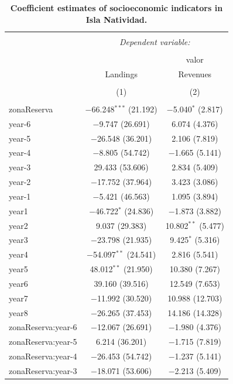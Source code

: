 \documentclass[10pt]{article}
\begin{document}
\clearpage

\begin{table}[h] \centering 
  \caption{{\bf Coefficient estimates of socioeconomic indicators in Isla Natividad.}} 
  \label{} 
\small 
\begin{tabular}{@{\extracolsep{1pt}}lcc} 
\\[-1.8ex]\hline 
\hline \\[-1.8ex] 
 & \multicolumn{2}{c}{\textit{Dependent variable:}} \\ 
\cline{2-3} 
\\[-1.8ex] &  & valor \\ 
 & Landings & Revenues \\ 
\\[-1.8ex] & (1) & (2)\\ 
\hline \\[-1.8ex] 
 zonaReserva & $-$66.248$^{***}$ (21.192) & $-$5.040$^{*}$ (2.817) \\ 
  year-6 & $-$9.747 (26.691) & 6.074 (4.376) \\ 
  year-5 & $-$26.548 (36.201) & 2.106 (7.819) \\ 
  year-4 & $-$8.805 (54.742) & $-$1.665 (5.141) \\ 
  year-3 & 29.433 (53.606) & 2.834 (5.409) \\ 
  year-2 & $-$17.752 (37.964) & 3.423 (3.086) \\ 
  year-1 & $-$5.421 (46.563) & 1.095 (3.894) \\ 
  year1 & $-$46.722$^{*}$ (24.836) & $-$1.873 (3.882) \\ 
  year2 & 9.037 (29.383) & 10.802$^{**}$ (5.477) \\ 
  year3 & $-$23.798 (21.935) & 9.425$^{*}$ (5.316) \\ 
  year4 & $-$54.097$^{**}$ (24.541) & 2.816 (5.541) \\ 
  year5 & 48.012$^{**}$ (21.950) & 10.380 (7.267) \\ 
  year6 & 39.160 (39.516) & 12.549 (7.653) \\ 
  year7 & $-$11.992 (30.520) & 10.988 (12.703) \\ 
  year8 & $-$26.265 (37.453) & 14.186 (14.328) \\ 
  zonaReserva:year-6 & $-$12.067 (26.691) & $-$1.980 (4.376) \\ 
  zonaReserva:year-5 & 6.214 (36.201) & $-$1.715 (7.819) \\ 
  zonaReserva:year-4 & $-$26.453 (54.742) & $-$1.237 (5.141) \\ 
  zonaReserva:year-3 & $-$18.071 (53.606) & $-$2.213 (5.409) \\ 

\end{tabular}
\end{table}
\end{document}
